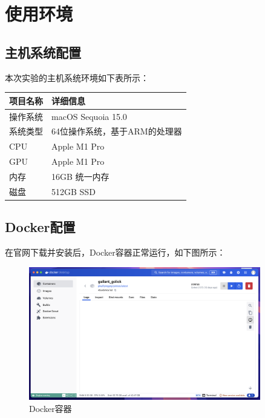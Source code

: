 \documentclass{article}
\begin{document}
\normalsize

\section{使用环境}

\subsection{主机系统配置}

本次实验的主机系统环境如下表所示：

\begin{center}
	\begin{tabular}{| >{\centering\arraybackslash}m{3cm} | >{\centering\arraybackslash}m{7cm} |}    
		\hline  
		\textbf{项目名称} & \textbf{详细信息} \\
		\hline  
		操作系统 & macOS Sequoia 15.0 \\  
		\hline  
		系统类型 & 64位操作系统，基于ARM的处理器 \\  
		\hline
		CPU & Apple M1 Pro \\  
		\hline 
		GPU & Apple M1 Pro\\  
		\hline 
		内存 & 16GB 统一内存 \\  
		\hline 
		磁盘 & 512GB SSD \\  
		\hline 		
	\end{tabular}
\end{center}

\subsection{Docker配置}

在官网下载并安装后，Docker容器正常运行，如下图所示：

\begin{figure}[H]
	\centering
	\includegraphics[width=0.9\textwidth]{img/docker_install.png}
	\caption{Docker容器}
\end{figure}
\end{document}
